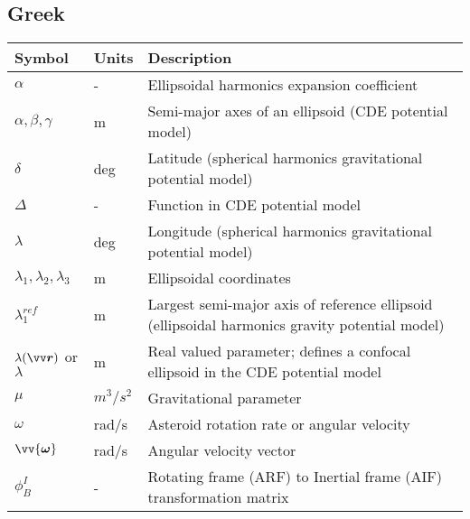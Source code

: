 \subsection*{Greek}
\begin{longtable}[l]{p{100pt} p{70pt} p{150pt}}
    \textbf{Symbol} & \textbf{Units} & \textbf{Description}                                 \\
    \hline
    $\alpha$            & -               & Ellipsoidal harmonics expansion coefficient     \\
    $\alpha, \beta, \gamma$ & m           & Semi-major axes of an ellipsoid
                                            (CDE potential model)                           \\
    $\delta$            & deg             & Latitude (spherical harmonics
                                            gravitational potential model)                  \\
    $\Delta$            & -               & Function in CDE potential model                 \\
    $\lambda$           & deg             & Longitude (spherical harmonics
                                            gravitational potential model)                  \\
    $\lambda_1, \lambda_2, \lambda_3$ & m & Ellipsoidal coordinates                         \\
    $\lambda_1^{ref}$   & m               & Largest semi-major axis of reference ellipsoid
                                            (ellipsoidal harmonics gravity potential model) \\
    $\lambda(\bvector{r})$ or $\lambda$ & m & Real valued parameter; defines a confocal
                                              ellipsoid in the CDE potential model          \\
    $\mu$               & $m^3/s^2$       & Gravitational parameter                         \\
    $\omega$            & rad/s           & Asteroid rotation rate or angular
                                            velocity                                        \\
    $\vv{\bm{\omega}}$  & rad/s           & Angular velocity vector                         \\
    $\phi_{B}^{I}$      & -               & Rotating frame (ARF) to Inertial frame (AIF)
                                            transformation matrix                           \\

\end{longtable}
